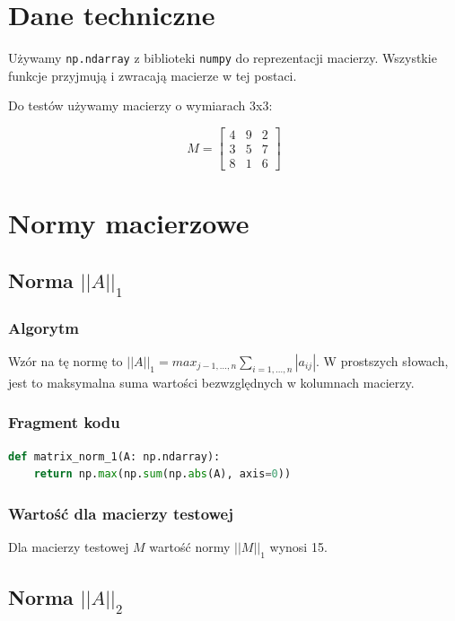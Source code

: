 \documentclass[a4paper]{article}
\begin{document}
\section{Dane techniczne}
Używamy \texttt{np.ndarray} z biblioteki \texttt{numpy} do reprezentacji macierzy. Wszystkie funkcje przyjmują i zwracają macierze w tej postaci.


Do testów używamy macierzy o wymiarach 3x3:

\[
    M =
\begin{bmatrix}
    4 & 9 & 2\\
    3 & 5 & 7\\
    8 & 1 & 6
\end{bmatrix}
\]



\section{Normy macierzowe}

\subsection{Norma $||A||_1$}

\subsubsection{Algorytm}
Wzór na tę normę to 
$||A||_1 = max_{j-1,...,n}\sum_{i=1,...,n}|a_{ij}|$. W prostszych słowach,
jest to maksymalna suma wartości bezwzględnych w kolumnach macierzy.

\subsubsection{Fragment kodu}

\begin{lstlisting}[language=python]
def matrix_norm_1(A: np.ndarray):
    return np.max(np.sum(np.abs(A), axis=0))
\end{lstlisting}

\subsubsection{Wartość dla macierzy testowej}

Dla macierzy testowej $M$ wartość normy $||M||_1$ wynosi 15.

\subsection{Norma $||A||_2$}
\end{document}
